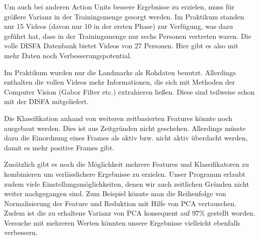 Um auch bei anderen Action Units bessere Ergebnisse zu erzielen, muss für
größere Varianz in der Trainingsmenge gesorgt werden. Im Praktikum standen nur
15 Videos (davon nur 10 in der ersten Phase) zur Verfügung, was dazu geführt
hat, dass in der Trainingsmenge nur sechs Personen vertreten waren. Die volle
DISFA Datenbank bietet Videos von 27 Personen. Hier gibt es also mit mehr Daten
noch Verbesserungspotential.

Im Praktikum wurden nur die Landmarks als Rohdaten benutzt. Allerdings enthalten
die vollen Videos mehr Informationen, die sich mit Methoden der Computer Vision
(Gabor Filter etc.) extrahieren ließen. Diese sind teilweise schon mit der DISFA mitgeliefert.

Die Klassifikation anhand von weiteren zeitbasierten Features könnte noch ausgebaut
werden. Dies ist aus Zeitgründen nicht geschehen. Allerdings müsste dazu die
Einordnung eines Frames als aktiv bzw. nicht aktiv überdacht werden, damit es
mehr positive Frames gibt.

Zusätzlich gibt es noch die Möglichkeit mehrere Features und Klassifikatoren zu kombinieren um verlässlichere Ergebnisse zu erzielen. Unser Programm erlaubt zudem viele Einstellungsmöglichkeiten, denen wir auch zeitlichen Gründen nicht weiter nachgegangen sind. Zum Beispiel könnte man die Reihenfolge von Normalisierung der Feature und Reduktion mit Hilfe von PCA vertauschen. Zudem ist die zu erhaltene Varianz von PCA konsequent  auf $97\%$ gestellt worden. Versuche mit mehreren Werten könnten unsere Ergebnisse vielleicht ebenfalls verbessern.

